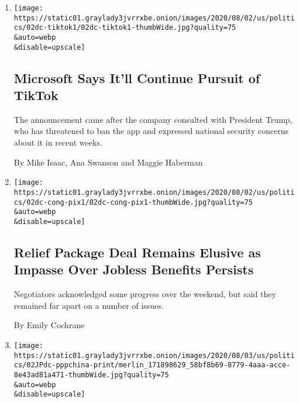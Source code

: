 \begin{enumerate}
\def\labelenumi{\arabic{enumi}.}
\item
  \href{/2020/08/02/business/economy/trump-tiktok-china-national-security.html}{}

  \texttt{[image: https://static01.graylady3jvrrxbe.onion/images/2020/08/02/us/politics/02dc-tiktok1/02dc-tiktok1-thumbWide.jpg?quality=75\\\&auto=webp\\\&disable=upscale]}

  \hypertarget{microsoft-says-itll-continue-pursuit-of-tiktok}{%
  \subsection{Microsoft Says It'll Continue Pursuit of
  TikTok}\label{microsoft-says-itll-continue-pursuit-of-tiktok}}

  The announcement came after the company consulted with President
  Trump, who has threatened to ban the app and expressed national
  security concerns about it in recent weeks.

  By Mike Isaac, Ana Swanson and Maggie Haberman
\item
  \href{/2020/08/02/us/politics/coronavirus-jobless-aid.html}{}

  \texttt{[image: https://static01.graylady3jvrrxbe.onion/images/2020/08/02/us/politics/02dc-cong-pix1/02dc-cong-pix1-thumbWide.jpg?quality=75\\\&auto=webp\\\&disable=upscale]}

  \hypertarget{relief-package-deal-remains-elusive-as-impasse-over-jobless-benefits-persists}{%
  \subsection{Relief Package Deal Remains Elusive as Impasse Over
  Jobless Benefits
  Persists}\label{relief-package-deal-remains-elusive-as-impasse-over-jobless-benefits-persists}}

  Negotiators acknowledged some progress over the weekend, but said they
  remained far apart on a number of issues.

  By Emily Cochrane
\item
  \href{/2020/08/02/us/politics/virus-china-ppp-small-business-loans.html}{}

  \texttt{[image: https://static01.graylady3jvrrxbe.onion/images/2020/08/03/us/politics/02JPdc-pppchina-print/merlin\_171898629\_58bf8b69-8779-4aaa-acce-8e43ad81a471-thumbWide.jpg?quality=75\\\&auto=webp\\\&disable=upscale]}

  \hypertarget{us-small-business-bailout-money-flowed-to-chinese-owned-companies}{%
}
\end{enumerate}
